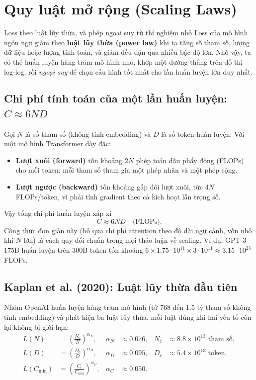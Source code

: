 
\section{Quy luật mở rộng (Scaling Laws)}
\label{sec:scaling_laws}

\begin{keyidea}{Loss theo luật lũy thừa, và phép ngoại suy từ thí nghiệm nhỏ}
Loss của mô hình ngôn ngữ giảm theo \textbf{luật lũy thừa (power law)} khi ta tăng số tham số, lượng dữ liệu hoặc lượng tính toán, và giảm đều đặn qua nhiều bậc độ lớn. Nhờ vậy, ta có thể huấn luyện hàng trăm mô hình nhỏ, khớp một đường thẳng trên đồ thị log-log, rồi \emph{ngoại suy} để chọn cấu hình tốt nhất cho lần huấn luyện lớn duy nhất.
\end{keyidea}

\subsection{Chi phí tính toán của một lần huấn luyện: $C \approx 6ND$}
\label{ssec:compute_6nd}
Gọi $N$ là số tham số (không tính embedding) và $D$ là số token huấn luyện. Với một mô hình Transformer dày đặc:
\begin{itemize}
	\item \textbf{Lượt xuôi (forward)} tốn khoảng $2N$ phép toán dấu phẩy động (FLOPs) cho mỗi token: mỗi tham số tham gia một phép nhân và một phép cộng.
	\item \textbf{Lượt ngược (backward)} tốn khoảng gấp đôi lượt xuôi, tức $4N$ FLOPs/token, vì phải tính gradient theo cả kích hoạt lẫn trọng số.
\end{itemize}
Vậy tổng chi phí huấn luyện xấp xỉ
\begin{equation}
	C \approx 6ND \quad \text{(FLOPs)}.
	\label{eq:compute_6nd}
\end{equation}
Công thức đơn giản này (bỏ qua chi phí attention theo độ dài ngữ cảnh, vốn nhỏ khi $N$ lớn) là cách quy đổi chuẩn trong mọi thảo luận về scaling. Ví dụ, GPT-3 175B huấn luyện trên 300B token tốn khoảng $6 \times 1.75\cdot 10^{11} \times 3\cdot 10^{11} \approx 3.15 \cdot 10^{23}$ FLOPs.

\subsection{Kaplan et al. (2020): Luật lũy thừa đầu tiên}
\label{ssec:kaplan_scaling}
Nhóm OpenAI \cite{kaplan2020scaling} huấn luyện hàng trăm mô hình (từ 768 đến 1.5 tỷ tham số không tính embedding) và phát hiện ba luật lũy thừa, mỗi luật đúng khi hai yếu tố còn lại không bị giới hạn:
\begin{align}
	L(N) &= \left(\frac{N_c}{N}\right)^{\alpha_N}, & \alpha_N &\approx 0.076, & N_c &\approx 8.8 \times 10^{13} \text{ tham số},\\
	L(D) &= \left(\frac{D_c}{D}\right)^{\alpha_D}, & \alpha_D &\approx 0.095, & D_c &\approx 5.4 \times 10^{13} \text{ token},\\
	L(C_{\min}) &= \left(\frac{C_c}{C_{\min}}\right)^{\alpha_C}, & \alpha_C &\approx 0.050.
\end{align}

